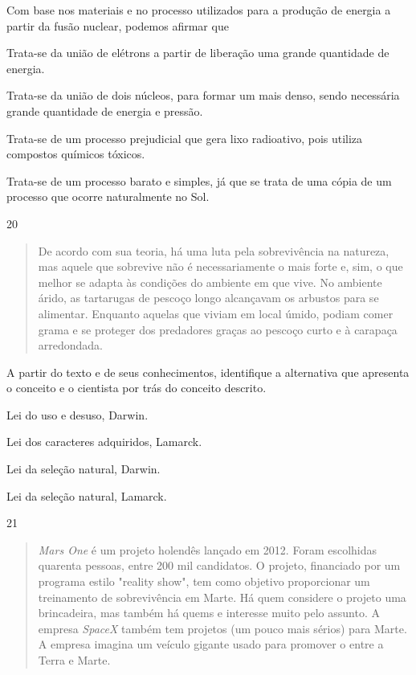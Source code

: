 Com base nos materiais e no processo utilizados para a produção de
energia a partir da fusão nuclear, podemos afirmar que

\begin{escolha}
\item
  Trata-se da união de elétrons a partir de liberação uma grande quantidade de energia.
\item
  Trata-se da união de dois núcleos, para formar um mais denso, sendo
  necessária grande quantidade de energia e pressão.
\item
  Trata-se de um processo prejudicial que gera lixo radioativo, pois
  utiliza compostos químicos tóxicos.
\item
  Trata-se de um processo barato e simples, já que se trata de uma cópia
  de um processo que ocorre naturalmente no Sol.
\end{escolha}

\num{20}
\begin{quote}
  De acordo com sua teoria, há uma luta pela sobrevivência na
  natureza, mas aquele que sobrevive não é necessariamente o mais forte
  e, sim, o que melhor se adapta às condições do ambiente em que vive.
  No ambiente árido, as tartarugas de pescoço longo alcançavam os
  arbustos para se alimentar. Enquanto aquelas que viviam em local
  úmido, podiam comer grama e se proteger dos predadores graças ao
  pescoço curto e à carapaça arredondada.

\end{quote}

\pagebreak
A partir do texto e de seus conhecimentos, identifique a alternativa que
apresenta o conceito e o cientista por trás do conceito descrito.

\begin{escolha}
\item
  Lei do uso e desuso, Darwin.
\item
  Lei dos caracteres adquiridos, Lamarck.
\item
  Lei da seleção natural, Darwin.
\item
  Lei da seleção natural, Lamarck.
\end{escolha}

\num{21}
  \begin{quote}
 \emph{Mars One} é um projeto holendês lançado em 2012. Foram
  escolhidas quarenta pessoas, entre 200 mil candidatos. O projeto, 
  financiado por um programa estilo "reality show", tem como objetivo proporcionar um treinamento de sobrevivência em Marte. Há quem considere o projeto uma brincadeira, mas também há quems e interesse muito pelo assunto. A empresa \emph{SpaceX} também tem projetos (um pouco mais sérios)
  para Marte. A empresa
  imagina um veículo gigante usado para promover o  entre a Terra e Marte.

\end{quote}

